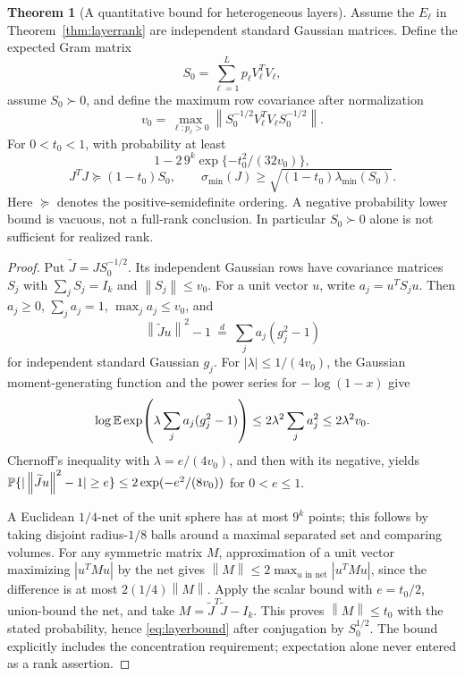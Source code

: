\documentclass[11pt,a4paper]{article}
\theoremstyle{definition}
\newtheorem{theorem}{Theorem}[section]
\theoremstyle{definition}
\theoremstyle{remark}\newtheorem{remark}[theorem]{Remark}
\newcommand{\smin}{\sigma_{\min}}\newcommand{\smax}{\sigma_{\max}}
\newcommand{\norm}[1]{\left\lVert #1\right\rVert}
\begin{document}
\begin{theorem}[A quantitative bound for heterogeneous layers]\label{thm:layercond}
Assume the $E_\ell$ in Theorem~\ref{thm:layerrank} are independent standard Gaussian matrices. Define the expected Gram matrix
\[
S_0=\sum_{\ell=1}^L p_\ell V_\ell^TV_\ell,
\]
assume $S_0\succ0$, and define the maximum row covariance after normalization
\[
v_0=\max_{\ell:p_\ell>0}
\norm{S_0^{-1/2}V_\ell^TV_\ell S_0^{-1/2}}.
\]
For $0<t_0<1$, with probability at least
\[
1-2\,9^k\exp\{-t_0^2/(32v_0)\},
\]
\begin{equation}\label{eq:layerbound}
J^TJ\succeq(1-t_0)S_0,
\qquad \smin(J)\ge\sqrt{(1-t_0)\lambda_{\min}(S_0)}.
\end{equation}
Here $\succeq$ denotes the positive-semidefinite ordering. A negative probability lower bound is vacuous, not a full-rank conclusion. In particular $S_0\succ0$ alone is not sufficient for realized rank.
\end{theorem}
\begin{proof}
Put $\widetilde J=JS_0^{-1/2}$. Its independent Gaussian rows have covariance matrices $S_j$ with $\sum_jS_j=I_k$ and $\norm{S_j}\le v_0$. For a unit vector $u$, write $a_j=u^TS_ju$. Then $a_j\ge0$, $\sum_ja_j=1$, $\max_ja_j\le v_0$, and
\[
\norm{\widetilde Ju}^2-1\ \stackrel{d}=\ \sum_j a_j(g_j^2-1)
\]
for independent standard Gaussian $g_j$. For $|\lambda|\le1/(4v_0)$, the Gaussian moment-generating function and the power series for $-\log(1-x)$ give
\[
\log\mathbb E\exp\!\left(\lambda\sum_j a_j(g_j^2-1)\right)
\le2\lambda^2\sum_j a_j^2\le2\lambda^2v_0.
\]
Chernoff's inequality with $\lambda=e/(4v_0)$, and then with its negative, yields
$\Prob\{|\norm{\widetilde Ju}^2-1|\ge e\}\le2\exp(-e^2/(8v_0))$ for $0<e\le1$.

A Euclidean $1/4$-net of the unit sphere has at most $9^k$ points; this follows by taking disjoint radius-$1/8$ balls around a maximal separated set and comparing volumes. For any symmetric matrix $M$, approximation of a unit vector maximizing $|u^TMu|$ by the net gives $\norm M\le2\max_{u\text{ in net}}|u^TMu|$, since the difference is at most $2(1/4)\norm M$. Apply the scalar bound with $e=t_0/2$, union-bound the net, and take $M=\widetilde J^T\widetilde J-I_k$. This proves $\norm M\le t_0$ with the stated probability, hence \eqref{eq:layerbound} after conjugation by $S_0^{1/2}$. The bound explicitly includes the concentration requirement; expectation alone never entered as a rank assertion.
\end{proof}
\end{document}
